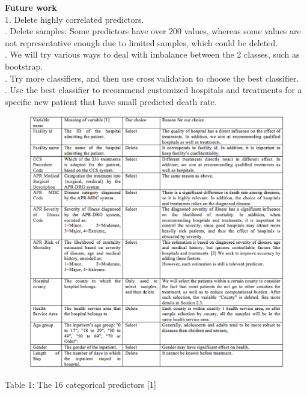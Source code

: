 \documentclass[a4paper]{article}
\begin{document}
\noindent
\textbf{\large Future work\\}
\noindent
1. Delete highly correlated predictors. \\%
. Delete samples: Some predictors have over 200 values, whereas some values are not representative enough due to limited samples, which could be deleted.\\
. We will try various ways to deal with imbalance between the 2 classes, such as bootstrap.\\
. Try more classifiers, and then use cross validation to choose the best classifier. \\
. Use the best classifier to recommend customized hospitals and treatments for a specific new patient that have small predicted death rate.\\

\begin{figure}[H]
\begin{center}
\includegraphics[width=5.0in]{table1_variable_information.png}
\end{center}
\end{figure}
\centerline
{Table 1: The 16 categorical predictors [1]}
\end{document}
